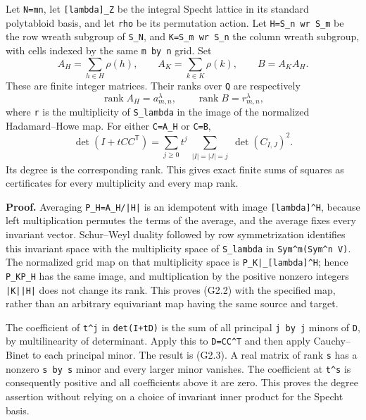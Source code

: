 \documentclass[
  10pt,
]{article}
\begin{document}
Let \texttt{\small N=\allowbreak{}mn}, let
\texttt{\small [\allowbreak{}lambda]\allowbreak{}\_\allowbreak{}Z} be
the integral Specht lattice in its standard polytabloid basis, and let
\texttt{\small rho} be its permutation action. Let
\texttt{\small H=\allowbreak{}S\_\allowbreak{}n wr S\_\allowbreak{}m} be
the row wreath subgroup of \texttt{\small S\_\allowbreak{}N}, and
\texttt{\small K=\allowbreak{}S\_\allowbreak{}m wr S\_\allowbreak{}n}
the column wreath subgroup, with cells indexed by the same
\texttt{\small m by n} grid. Set \[
A_H=\sum_{h\in H}\rho(h),\qquad A_K=\sum_{k\in K}\rho(k),\qquad B=A_KA_H.
\tag{G2.1}
\] These are finite integer matrices. Their ranks over \texttt{\small Q}
are respectively \[
\operatorname{rank} A_H=a_{m,n}^{\lambda},\qquad
\operatorname{rank} B=r_{m,n}^{\lambda},
\tag{G2.2}
\] where \texttt{\small r} is the multiplicity of
\texttt{\small S\_\allowbreak{}lambda} in the image of the normalized
Hadamard--Howe map. For either
\texttt{\small C=\allowbreak{}A\_\allowbreak{}H} or
\texttt{\small C=\allowbreak{}B}, \[
\det(I+tCC^{\mathsf T})=
\sum_{j\ge0}t^j
\sum_{\substack{|I|=|J|=j}}\det(C_{I,J})^2.
\tag{G2.3}
\] Its degree is the corresponding rank. This gives exact finite sums of
squares as certificates for every multiplicity and every map rank.

\textbf{Proof.} Averaging
\texttt{\small P\_\allowbreak{}H=\allowbreak{}A\_\allowbreak{}H/\allowbreak{}|H|}
is an idempotent with image
\texttt{\small [\allowbreak{}lambda]\allowbreak{}\textasciicircum{}H},
because left multiplication permutes the terms of the average, and the
average fixes every invariant vector. Schur--Weyl duality followed by
row symmetrization identifies this invariant space with the multiplicity
space of \texttt{\small S\_\allowbreak{}lambda} in
\texttt{\small Sym\textasciicircum{}m(\allowbreak{}Sym\textasciicircum{}n V)\allowbreak{}}.
The normalized grid map on that multiplicity space is
\texttt{\small P\_\allowbreak{}K|\_\allowbreak{}[\allowbreak{}lambda]\allowbreak{}\textasciicircum{}H};
hence \texttt{\small P\_\allowbreak{}KP\_\allowbreak{}H} has the same
image, and multiplication by the positive nonzero integers
\texttt{\small |K||H|} does not change its rank. This proves (G2.2) with
the specified map, rather than an arbitrary equivariant map having the
same source and target.

The coefficient of \texttt{\small t\textasciicircum{}j} in
\texttt{\small det(\allowbreak{}I+\allowbreak{}tD)\allowbreak{}} is the
sum of all principal \texttt{\small j by j} minors of \texttt{\small D},
by multilinearity of determinant. Apply this to
\texttt{\small D=\allowbreak{}CC\textasciicircum{}T} and then apply
Cauchy--Binet to each principal minor. The result is (G2.3). A real
matrix of rank \texttt{\small s} has a nonzero \texttt{\small s by s}
minor and every larger minor vanishes. The coefficient at
\texttt{\small t\textasciicircum{}s} is consequently positive and all
coefficients above it are zero. This proves the degree assertion without
relying on a choice of invariant inner product for the Specht basis.
\end{document}
